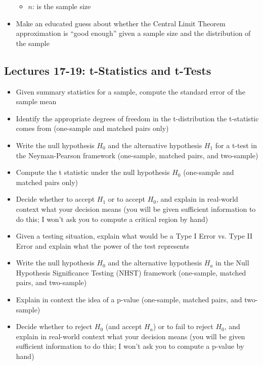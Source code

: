 \documentclass[11pt]{article} %
\begin{document}
\begin{itemize}
{\begin{itemize}
        \item $n$: is the sample size
        \end{itemize}}
\item Make an educated guess about whether the Central Limit Theorem approximation is ``good enough'' given a sample size and the distribution of the sample
\end{itemize}

\newpage

\subsection{Lectures 17-19: t-Statistics and t-Tests}

\begin{itemize}
\item Given summary statistics for a sample, compute the standard error of the sample mean
\item Identify the appropriate degrees of freedom in the t-distribution the t-statistic comes from (one-sample and matched pairs only)
\item Write the null hypothesis $H_0$ and the alternative hypothesis $H_1$ for a t-test in the Neyman-Pearson framework (one-sample, matched pairs, and two-sample)
\item Compute the t statistic under the null hypothesis $H_0$ (one-sample and matched pairs only)
\item Decide whether to accept $H_1$ or to accept $H_0$, and explain in real-world context what your decision means (you will be given sufficient information to do this; I won't ask you to compute a critical region by hand)
\item Given a testing situation, explain what would be a Type I Error vs. Type II Error and explain what the power of the test represents
\item Write the null hypothesis $H_0$ and the alternative hypothesis $H_a$ in the Null Hypothesis Significance Testing (NHST) framework (one-sample, matched pairs, and two-sample)
\item Explain in context the idea of a p-value (one-sample, matched pairs, and two-sample)
\item Decide whether to reject $H_0$ (and accept $H_a$) or to fail to reject $H_0$, and explain in real-world context what your decision means (you will be given sufficient information to do this; I won't ask you to compute a p-value by hand)
\end{itemize}
\end{document}
